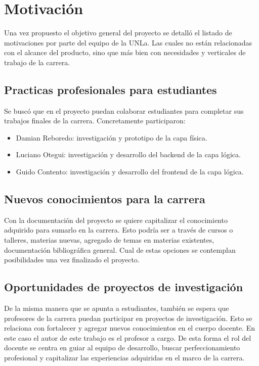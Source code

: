 
\section{Motivación}
Una vez propuesto el objetivo general del proyecto se detalló el listado de motivaciones por parte del equipo de la UNLa. Las cuales no están relacionadas con el alcance del producto, sino que más bien con necesidades y verticales de trabajo de la carrera. 

\subsection{Practicas profesionales para estudiantes}
Se buscó que en el proyecto puedan colaborar estudiantes para completar sus trabajos finales de la carrera. Concretamente participaron:
\begin{itemize}
\item Damian Reboredo: investigación y prototipo de la capa física.
\item Luciano Otegui: investigación y desarrollo del backend de la capa lógica.
\item Guido Contento: investigación y desarrollo del frontend de la capa lógica.
\end{itemize}

\subsection{Nuevos conocimientos para la carrera}
Con la documentación del proyecto se quiere capitalizar el conocimiento adquirido para sumarlo en la carrera. Esto podría ser a través de cursos o talleres, materias nuevas, agregado de temas en materias existentes, documentación bibliográfica general. Cual de estas opciones se contemplan posibilidades una vez finalizado el proyecto.

\subsection{Oportunidades de proyectos de investigación}
De la misma manera que se apunta a estudiantes, también se espera que profesores de la carrera puedan participar en proyectos de investigación. Esto se relaciona con fortalecer y agregar nuevos conocimientos en el cuerpo docente. En este caso el autor de este trabajo es el profesor a cargo. De esta forma el rol del docente se centra en guiar al equipo de desarrollo, buscar perfeccionamiento profesional y capitalizar las experiencias adquiridas en el marco de la carrera.

